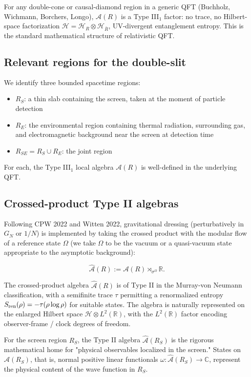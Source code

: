 \documentclass[11pt,a4paper]{article}
\begin{document}
For any double-cone or causal-diamond region in a generic QFT (Buchholz, Wichmann, Borchers, Longo), $\mathcal{A}(R)$ is a Type III$_1$ factor: no trace, no Hilbert-space factorization $\mathcal{H} = \mathcal{H}_R \otimes \mathcal{H}_{\bar R}$, UV-divergent entanglement entropy. This is the standard mathematical structure of relativistic QFT.

\subsection{Relevant regions for the double-slit}

We identify three bounded spacetime regions:

\begin{itemize}
  \item $R_S$: a thin slab containing the screen, taken at the moment of particle detection
  \item $R_E$: the environmental region containing thermal radiation, surrounding gas, and electromagnetic background near the screen at detection time
  \item $R_{SE} = R_S \cup R_E$: the joint region
\end{itemize}

For each, the Type III$_1$ local algebra $\mathcal{A}(R)$ is well-defined in the underlying QFT.

\subsection{Crossed-product Type II algebras}

Following CPW 2022 and Witten 2022, gravitational dressing (perturbatively in $G_N$ or $1/N$) is implemented by taking the crossed product with the modular flow of a reference state $\Omega$ (we take $\Omega$ to be the vacuum or a quasi-vacuum state appropriate to the asymptotic background):

\[
\hat{\mathcal{A}}(R) := \mathcal{A}(R) \rtimes_{\sigma^\Omega} \mathbb{R}.
\]

The crossed-product algebra $\hat{\mathcal{A}}(R)$ is of Type II in the Murray-von Neumann classification, with a semifinite trace $\tau$ permitting a renormalized entropy $S_{\rm ren}(\rho) = -\tau(\rho \log \rho)$ for suitable states. The algebra is naturally represented on the enlarged Hilbert space $\mathcal{H} \otimes L^2(\mathbb{R})$, with the $L^2(\mathbb{R})$ factor encoding observer-frame / clock degrees of freedom.

For the screen region $R_S$, the Type II algebra $\hat{\mathcal{A}}(R_S)$ is the rigorous mathematical home for "physical observables localized in the screen." States on $\hat{\mathcal{A}}(R_S)$, that is, normal positive linear functionals $\omega: \hat{\mathcal{A}}(R_S) \to \mathbb{C}$, represent the physical content of the wave function in $R_S$.
\end{document}
